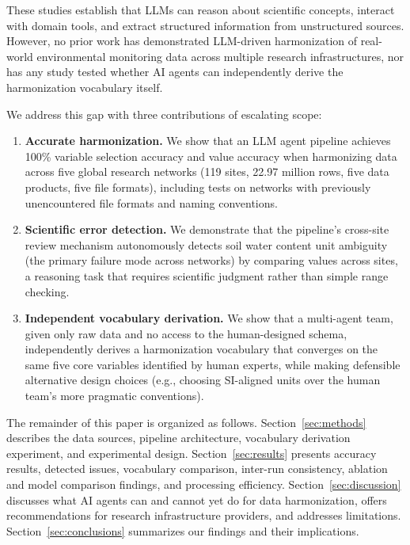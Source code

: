 \documentclass[review,authoryear]{elsarticle}
\begin{document}
These studies establish that LLMs can reason about scientific concepts, interact with domain tools, and extract structured information from unstructured sources. However, no prior work has demonstrated LLM-driven harmonization of real-world environmental monitoring data across multiple research infrastructures, nor has any study tested whether AI agents can independently derive the harmonization vocabulary itself.

We address this gap with three contributions of escalating scope:

\begin{enumerate}
  \item \textbf{Accurate harmonization.} We show that an LLM agent pipeline achieves 100\% variable selection accuracy and value accuracy when harmonizing data across five global research networks (119 sites, 22.97 million rows, five data products, five file formats), including tests on networks with previously unencountered file formats and naming conventions.
  \item \textbf{Scientific error detection.} We demonstrate that the pipeline's cross-site review mechanism autonomously detects soil water content unit ambiguity (the primary failure mode across networks) by comparing values across sites, a reasoning task that requires scientific judgment rather than simple range checking.
  \item \textbf{Independent vocabulary derivation.} We show that a multi-agent team, given only raw data and no access to the human-designed schema, independently derives a harmonization vocabulary that converges on the same five core variables identified by human experts, while making defensible alternative design choices (e.g., choosing SI-aligned units over the human team's more pragmatic conventions).
\end{enumerate}

The remainder of this paper is organized as follows. Section~\ref{sec:methods} describes the data sources, pipeline architecture, vocabulary derivation experiment, and experimental design. Section~\ref{sec:results} presents accuracy results, detected issues, vocabulary comparison, inter-run consistency, ablation and model comparison findings, and processing efficiency. Section~\ref{sec:discussion} discusses what AI agents can and cannot yet do for data harmonization, offers recommendations for research infrastructure providers, and addresses limitations. Section~\ref{sec:conclusions} summarizes our findings and their implications.
\end{document}
